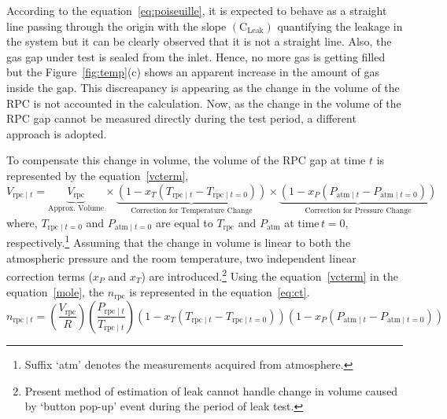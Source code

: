 According to the equation~\ref{eq:poiseuille}, it is expected to behave as a straight line passing through the origin with the slope $\left(\textrm{C}_{\textrm{Leak}}\right)$ quantifying the leakage in the system but it can be clearly observed that it is not a straight line. Also, the gas gap under test is sealed from the inlet. Hence, no more gas is getting filled but the Figure~\ref{fig:temp}(c) shows an apparent increase in the amount of gas inside the gap. This discreapancy is appearing as the change in the volume of the RPC is not accounted in the calculation. Now, as the change in the volume of the RPC gap cannot be measured directly during the test period, a different approach is adopted.

To compensate this change in volume, the volume of the RPC gap at time $t$ is represented by the equation~\ref{vcterm},
\begin{equation}
  V_{\textrm{rpc}\mid t} = \underbrace{V_{\textrm{rpc}}}_{\text{Approx. Volume}}\times\underbrace{\left(1-x_T\left(T_{\textrm{rpc}\mid t}-T_{\textrm{rpc}\mid t=0}\right)\right)}_{\text{Correction for Temperature Change}}\times\underbrace{\left(1-x_P\left(P_{\textrm{atm}\mid t}-P_{\textrm{atm}\mid t=0}\right)\right)}_{\text{Correction for Pressure Change}}\label{vcterm}
\end{equation}
where, $T_{\textrm{rpc}\mid t=0}$ and $P_{\textrm{atm}\mid t=0}$ are equal to $T_{\textrm{rpc}}$ and $P_{\textrm{atm}}$ at time\,$t=0$, respectively.\footnote{Suffix `atm' denotes the measurements acquired from atmosphere.} Assuming that the change in volume is linear to both the atmospheric pressure and the room temperature, two independent linear correction terms ($x_P$ and $x_T$) are introduced.\footnote{Present method of estimation of leak cannot handle change in volume caused by `button pop-up' event during the period of leak test.} Using the equation~\ref{vcterm} in the equation~\ref{mole}, the $n_{\textrm{rpc}}$ is represented in the equation~\ref{eq:ct}.
\begin{equation}
  n_{\textrm{rpc}\mid t}=\left(\frac{V_{\textrm{rpc}}}{R}\right)\left(\frac{P_{\textrm{rpc}\mid t}}{T_{\textrm{rpc}\mid t}}\right)\left(1-x_T\left(T_{\textrm{rpc}\mid t}-T_{\textrm{rpc}\mid t=0}\right)\right)\left(1-x_P\left(P_{\textrm{atm}\mid t}-P_{\textrm{atm}\mid t=0}\right)\right) \label{eq:ct}
\end{equation}

